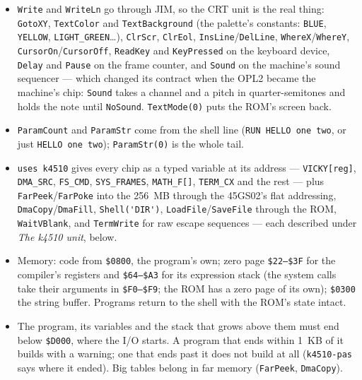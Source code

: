 \begin{itemize}
\item \verb|Write| and \verb|WriteLn| go through JIM, so the CRT unit is
  the real thing: \verb|GotoXY|, \verb|TextColor| and
  \verb|TextBackground| (the palette's constants: \verb|BLUE|,
  \verb|YELLOW|, \verb|LIGHT_GREEN|\ldots), \verb|ClrScr|, \verb|ClrEol|,
  \verb|InsLine|/\verb|DelLine|, \verb|WhereX|/\verb|WhereY|,
  \verb|CursorOn|/\verb|CursorOff|, \verb|ReadKey| and \verb|KeyPressed|
  on the keyboard device, \verb|Delay| and \verb|Pause| on the frame
  counter, and \verb|Sound| on the machine's sound sequencer --- which
  changed its contract when the OPL2 became the machine's chip:
  \verb|Sound| takes a channel and a pitch in quarter-semitones and
  holds the note until \verb|NoSound|. \verb|TextMode(0)| puts the
  ROM's screen back.
\item \verb|ParamCount| and \verb|ParamStr| come from the shell
  line (\texttt{RUN HELLO one two}, or just \texttt{HELLO one two});
  \verb|ParamStr(0)| is the whole tail.
\item \verb|uses k4510| gives every chip as a typed variable at its
  address --- \verb|VICKY[reg]|, \verb|DMA_SRC|,
  \verb|FS_CMD|, \verb|SYS_FRAMES|, \verb|MATH_F[]|, \verb|TERM_CX|
  and the rest --- plus \verb|FarPeek|/\verb|FarPoke| into the 256~MB
  through the 45GS02's flat addressing, \verb|DmaCopy|/\verb|DmaFill|,
  \verb|Shell('DIR')|, \verb|LoadFile|/\verb|SaveFile| through the ROM,
  \verb|WaitVBlank|, and \verb|TermWrite| for raw escape sequences ---
  each described under \emph{The k4510 unit}, below.
\item Memory: code from \texttt{\$0800}, the program's own; zero page
  \texttt{\$22--\$3F} for the compiler's registers and
  \texttt{\$64--\$A3} for its expression stack (the system calls take
  their arguments in \texttt{\$F0--\$F9}; the ROM has a zero page of its
  own); \texttt{\$0300} the string
  buffer. Programs return to the shell with the ROM's state intact.
\item The program, its variables and the stack that grows above them
  must end below \texttt{\$D000}, where the I/O starts. A program that
  ends within 1~KB of it builds with a warning; one that ends past it
  does not build at all (\texttt{k4510-pas} says where it ended). Big
  tables belong in far memory (\verb|FarPeek|, \verb|DmaCopy|).
\end{itemize}

